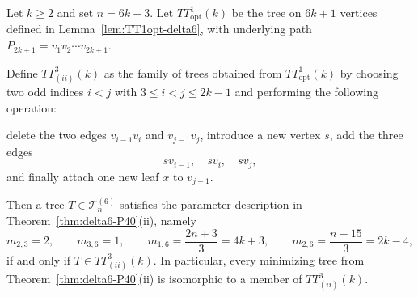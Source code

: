 \documentclass[preprint,12pt]{elsarticle}
\begin{document}
\begin{lemma}
\label{lem:TT3iiopt-delta6}
Let $k\ge 2$ and set $n=6k+3$.
Let $TT^1_{\mathrm{opt}}(k)$ be the tree on $6k+1$ vertices defined in
Lemma~\ref{lem:TT1opt-delta6}, with underlying path
$P_{2k+1}=v_1v_2\cdots v_{2k+1}$.

Define $TT^{3}_{(ii)}(k)$ as the family of trees obtained from
$TT^1_{\mathrm{opt}}(k)$ by choosing two odd indices $i<j$ with
$3\le i<j\le 2k-1$ and performing the following operation:

delete the two edges $v_{i-1}v_i$ and $v_{j-1}v_j$, introduce a new vertex $s$,
add the three edges
\[
sv_{i-1},\quad sv_i,\quad sv_j,
\]
and finally attach one new leaf $x$ to $v_{j-1}$.

Then a tree $T\in\mathcal{T}^{(6)}_n$ satisfies the parameter description in
Theorem~\ref{thm:delta6-P40}\textup{(ii)}, namely
\[
m_{2,3}=2,\qquad m_{3,6}=1,\qquad
m_{1,6}=\frac{2n+3}{3}=4k+3,\qquad
m_{2,6}=\frac{n-15}{3}=2k-4,
\]
if and only if $T\in TT^{3}_{(ii)}(k)$.
In particular, every minimizing tree from
Theorem~\ref{thm:delta6-P40}\textup{(ii)} is isomorphic to a member of
$TT^{3}_{(ii)}(k)$.
\end{lemma}
\end{document}
